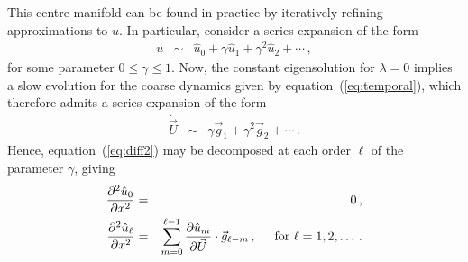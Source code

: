 \documentclass[12pt,a5paper]{article}
\begin{document}
This centre manifold can be found in practice by iteratively refining approximations to $u$. In particular, consider a series expansion of the form
\begin{eqnarray}
	u  & \sim & \hat{u}_0+\gamma\hat{u}_1+\gamma^2\hat{u}_2+\cdots\,,
\label{eq:u:series}
\end{eqnarray}
for some parameter $0\le\gamma\le 1$.
Now, the constant eigensolution for $\lambda=0$ implies a slow evolution for the coarse dynamics given by 
equation~(\ref{eq:temporal}), which therefore admits a series expansion of the form
\begin{eqnarray}
	\dot{{\vec U}} & \sim & \gamma {\vec g}_1+\gamma^2 {\vec g}_2+\cdots\,.
\label{eq:Udot:series}
\end{eqnarray}
Hence, equation~(\ref{eq:diff2}) may be decomposed at each order 
$\ell$ of the parameter $\gamma$, giving
\begin{eqnarray}
   \DD {x}{\hat{u}_0} & = & 0\,, \label{eq:pert1}
\\
  \DD {x}{\hat{u}_\ell} & = & \sum_{m=0}^{\ell-1}\D {\vec U}{\hat{u}_m}\cdot{\vec g}_{\ell-m}\,,
\hspace*{5mm}\mbox{for }\ell=1,2,\ldots\,.
\label{eq:pert_ell}
\end{eqnarray}
\end{document}

